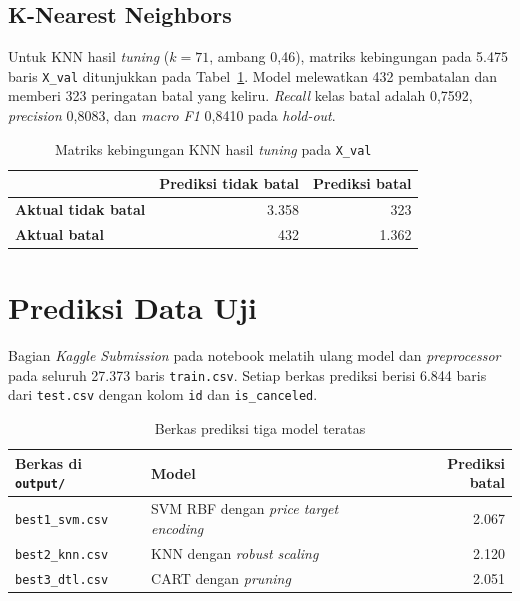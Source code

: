 \subsection{K-Nearest Neighbors}

Untuk KNN hasil \textit{tuning} ($k=71$, ambang 0,46), matriks kebingungan
pada 5.475 baris \texttt{X\_val} ditunjukkan pada
Tabel~\ref{tab:cm-knn}. Model melewatkan 432 pembatalan dan memberi 323
peringatan batal yang keliru. \textit{Recall} kelas batal adalah 0,7592,
\textit{precision} 0,8083, dan \textit{macro F1} 0,8410 pada \textit{hold-out}.

\begin{table}[H]
	\centering
	\caption{Matriks kebingungan KNN hasil \textit{tuning} pada \texttt{X\_val}}
	\label{tab:cm-knn}
	\begin{tabular}{l r r}
		\toprule
		& \textbf{Prediksi tidak batal} & \textbf{Prediksi batal} \\
		\midrule
		\textbf{Aktual tidak batal} & 3.358 & 323 \\
		\textbf{Aktual batal} & 432 & 1.362 \\
		\bottomrule
	\end{tabular}
\end{table}

\section{Prediksi Data Uji}
\label{sec:prediksi-uji}

Bagian \textit{Kaggle Submission} pada notebook melatih ulang model dan
\textit{preprocessor} pada seluruh 27.373 baris \texttt{train.csv}.
Setiap berkas prediksi berisi 6.844 baris dari \texttt{test.csv} dengan
kolom \texttt{id} dan \texttt{is\_canceled}.

\begin{table}[H]
	\centering
	\caption{Berkas prediksi tiga model teratas}
	\label{tab:prediksi-uji}
	\small
	\begin{tabular}{l l r}
		\toprule
		\textbf{Berkas di \texttt{output/}} & \textbf{Model} & \textbf{Prediksi batal} \\
		\midrule
		\texttt{best1\_svm.csv} & SVM RBF dengan \textit{price target encoding} & 2.067 \\
		\texttt{best2\_knn.csv} & KNN dengan \textit{robust scaling} & 2.120 \\
		\texttt{best3\_dtl.csv} & CART dengan \textit{pruning} & 2.051 \\
		\bottomrule
	\end{tabular}
\end{table}

